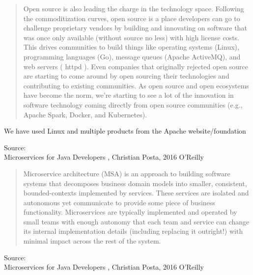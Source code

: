 \documentclass[Screen16to9,17pt]{foils}
\begin{document}

\begin{quote}\small
Open source is also leading the charge in the technology space. Following the commoditization curves, open source is a place developers can go to challenge proprietary vendors by building and
  innovating on software that was once only available (without source
  no less) with high license costs. This drives communities to build
  things like operating systems (Linux), programming languages (Go),
  message queues (Apache ActiveMQ), and web servers ( httpd ). Even
  companies that originally rejected open source are starting to come
  around by open sourcing their technologies and contributing to
  existing communities. As open source and open ecosystems have
  become the norm, we’re starting to see a lot of the innovation in
  software technology coming directly from open source communities
  (e.g., Apache Spark, Docker, and Kubernetes).
\end{quote}

\begin{list2}
\item We have used Linux and multiple products from the Apache website/foundation
\end{list2}
Source: {\footnotesize\\
Microservices for Java Developers , Christian Posta, 2016 O’Reilly}






\begin{quote}\small
  Microservice architecture (MSA) is an approach to building software systems that decomposes business domain models into smaller,
  consistent, bounded-contexts implemented by services. These services are isolated and autonomous yet communicate to provide some
  piece of business functionality. Microservices are typically implemented and operated by small teams with enough autonomy that
  each team and service can change its internal implementation
  details (including replacing it outright!) with minimal impact across
  the rest of the system.
\end{quote}

Source: {\footnotesize\\
Microservices for Java Developers , Christian Posta, 2016 O’Reilly}
\end{document}
